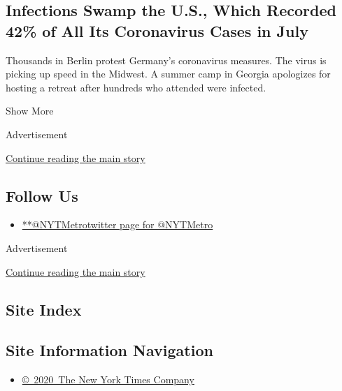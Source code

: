 \begin{enumerate}
{  \subsection{Infections Swamp the U.S., Which Recorded 42\% of All Its
  Coronavirus Cases in
  July}\label{infections-swamp-the-us-which-recorded-42-of-all-its-coronavirus-cases-in-july}}

  Thousands in Berlin protest Germany's coronavirus measures. The virus
  is picking up speed in the Midwest. A summer camp in Georgia
  apologizes for hosting a retreat after hundreds who attended were
  infected.
\end{enumerate}

Show More

Advertisement

\protect\hyperlink{after-mid2}{Continue reading the main story}

\hypertarget{follow-us}{%
\subsection{Follow Us}\label{follow-us}}

\begin{itemize}
\tightlist
\item
  \href{https://twitter.com/NYTMetro}{**@NYTMetrotwitter page for
  @NYTMetro}
\end{itemize}

Advertisement

\protect\hyperlink{after-mktg}{Continue reading the main story}

\hypertarget{site-index}{%
\subsection{Site Index}\label{site-index}}

\hypertarget{site-information-navigation}{%
\subsection{Site Information
Navigation}\label{site-information-navigation}}

\begin{itemize}
\tightlist
\item
  \href{https://help.nytimes.com/hc/en-us/articles/115014792127-Copyright-notice}{©~2020~The
  New York Times Company}
\end{itemize}

